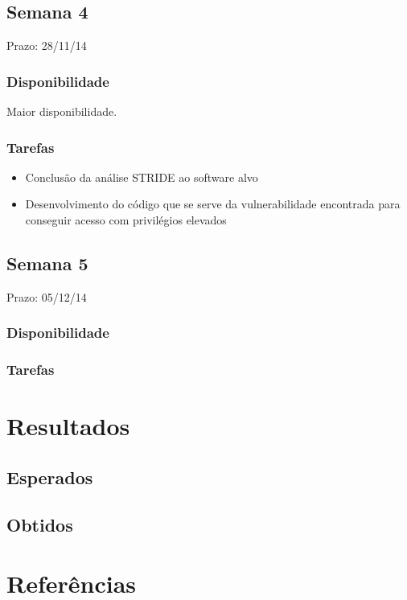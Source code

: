 \documentclass[a4paper]{article}
\begin{document}
\subsection{Semana 4}
Prazo: 28/11/14
\subsubsection{Disponibilidade}
Maior disponibilidade.
\subsubsection{Tarefas}
\begin{itemize}
	\item Conclusão da análise STRIDE ao software alvo
	\item Desenvolvimento do código que se serve da vulnerabilidade encontrada para conseguir acesso com privilégios elevados
\end{itemize}

\subsection{Semana 5}
Prazo: 05/12/14
\subsubsection{Disponibilidade}
\subsubsection{Tarefas}

\pagebreak

\section{Resultados}

\subsection{Esperados}
\subsection{Obtidos}

\pagebreak

\section{Referências}
\end{document}
